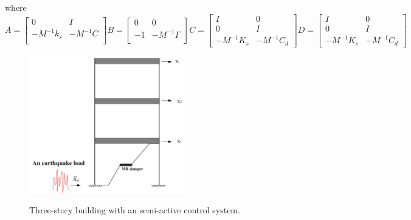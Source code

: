 where
\begin{subequations}
\begin{equation}       
A=\left[                 
  \begin{array}{cc}   
   0 & I \\  
   -M^{-1}k_s & -M^{-1}C\\ 
  \end{array}
\right]               
\end{equation}

\begin{equation}       
B=\left[                 
  \begin{array}{cc}   
   0 & 0\\  
   -1 & -M^{-1}\Gamma\\ 
  \end{array}
\right]               
\end{equation}

\begin{equation}       
C=\left[                 
  \begin{array}{cc}   
   I & 0\\  
   0 & I\\ 
   -M^{-1}K_s & -M^{-1}C_d
  \end{array}
\right]               
\end{equation}

\begin{equation}       
D=\left[                 
  \begin{array}{cc}   
   I & 0\\  
   0 & I\\ 
   -M^{-1}K_s & -M^{-1}C_d
  \end{array}
\right]               
\end{equation}

\end{subequations}

\begin{figure}[!h]
\centering
{\includegraphics[width=0.6\textwidth]{structure.jpg}} 
\caption{Three-story building with an semi-active control system.} 
\label{structure} 
\end{figure} 

